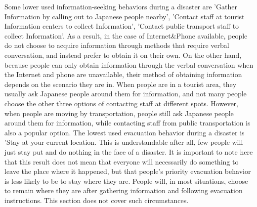 Some lower used information-seeking behaviors during a disaster are 'Gather Information by calling out to Japanese people nearby', 'Contact staff at tourist Information centers to collect Information', 'Contact public transport staff to collect Information'. As a result, in the case of Internet\&Phone available, people do not choose to acquire information through methods that require verbal conversation, and instead prefer to obtain it on their own. On the other hand, because people can only obtain information through the verbal conversation when the Internet and phone are unavailable, their method of obtaining information depends on the scenario they are in. When people are in a tourist area, they usually ask Japanese people around them for information, and not many people choose the other three options of contacting staff at different spots. However, when people are moving by transportation, people still ask Japanese people around them for information, while contacting staff from public transportation is also a popular option. The lowest used evacuation behavior during a disaster is 'Stay at your current location. This is understandable after all, few people will just stay put and do nothing in the face of a disaster. It is important to note here that this result does not mean that everyone will necessarily do something to leave the place where it happened, but that people's priority evacuation behavior is less likely to be to stay where they are. People will, in most situations, choose to remain where they are after gathering information and following evacuation instructions. This section does not cover such circumstances.

